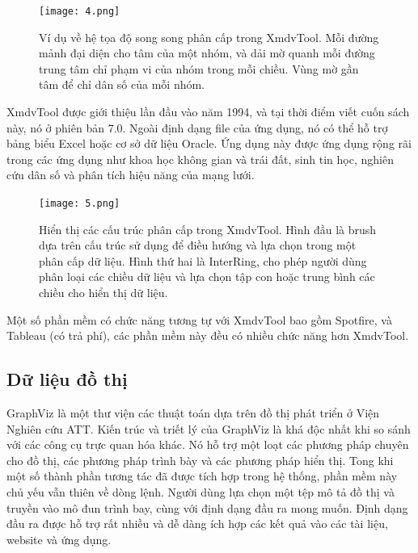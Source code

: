 \documentclass[13pt]{scrartcl} %
\begin{document}
\begin{figure}[!ht] %
    \centering
    \texttt{[image: 4.png]}
    \caption{Ví dụ về hệ tọa độ song song phân cấp trong XmdvTool. Mỗi đường mảnh đại diện cho tâm của một nhóm, và dải mờ quanh mỗi đường trung tâm chỉ phạm vi của nhóm trong mỗi chiều. Vùng mờ gần tâm để chỉ dân số của mỗi nhóm. }
\end{figure}


XmdvTool được giới thiệu lần đầu vào năm 1994, và tại thời điểm viết cuốn sách này, nó ở phiên bản 7.0. Ngoài định dạng file của ứng dụng, nó có thể hỗ trợ bảng biểu Excel hoặc cơ sở dữ liệu Oracle. Ứng dụng này được ứng dụng rộng rãi trong các ứng dụng như khoa học không gian và trái đất, sinh tin học, nghiên cứu dân số và phân tích hiệu năng của mạng lưới.

\begin{figure}[!ht] %
    \centering
    \texttt{[image: 5.png]}
    \caption{Hiển thị các cấu trúc phân cấp trong XmdvTool. Hình đầu là brush dựa trên cấu trúc sử dụng để điều hướng và lựa chọn trong một phân cấp dữ liệu. Hình thứ hai là InterRing, cho phép người dùng phân loại các chiều dữ liệu và lựa chọn tập con hoặc trung bình các chiều cho hiển thị dữ liệu.}
\end{figure}

Một số phần mềm có chức năng tương tự với XmdvTool bao gồm Spotfire, và Tableau (có trả phí), các phần mềm này đều có nhiều chức năng hơn XmdvTool.


\subsection{Dữ liệu đồ thị}

GraphViz là một thư viện các thuật toán dựa trên đồ thị phát triển ở Viện Nghiên cứu ATT. Kiến trúc và triết lý của GraphViz là khá độc nhất khi so sánh với các công cụ trực quan hóa khác. Nó hỗ trợ một loạt các phương pháp chuyên cho đồ thị, các phương pháp trình bày và các phương pháp hiển thị. Tong khi một số thành phần tương tác đã được tích hợp trong hệ thống, phần mềm này chủ yếu vẫn thiên về dòng lệnh. Người dùng lựa chọn một tệp mô tả đồ thị và truyền vào mô đun trình bay, cùng với định dạng đầu ra mong muốn. Định dạng đầu ra được hỗ trợ rất nhiều và dễ dàng ích hợp các kết quả vào các tài liệu, website và ứng dụng.
\end{document}
